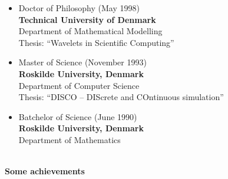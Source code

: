 \documentclass[11pt,a4paper]{article}
\begin{document}
\begin{itemize}
\item Doctor of Philosophy (May 1998) \\
{\bf Technical University of Denmark} \\
Department of Mathematical Modelling  \\
Thesis: ``Wavelets in Scientific Computing''\\

\item  Master of Science (November 1993) \\
{\bf Roskilde University, Denmark} \\
Department of Computer Science \\
Thesis: ``DISCO -- DIScrete and COntinuous simulation''\\

\item  Batchelor of Science (June 1990) \\
{\bf Roskilde University, Denmark} \\
Department of Mathematics \\
\end{itemize}


\pagebreak

\begin{center}
  \hrulefill \\
  {\bf Some achievements} \\[-0.2cm]
  \hrulefill
\end{center}
\end{document}

